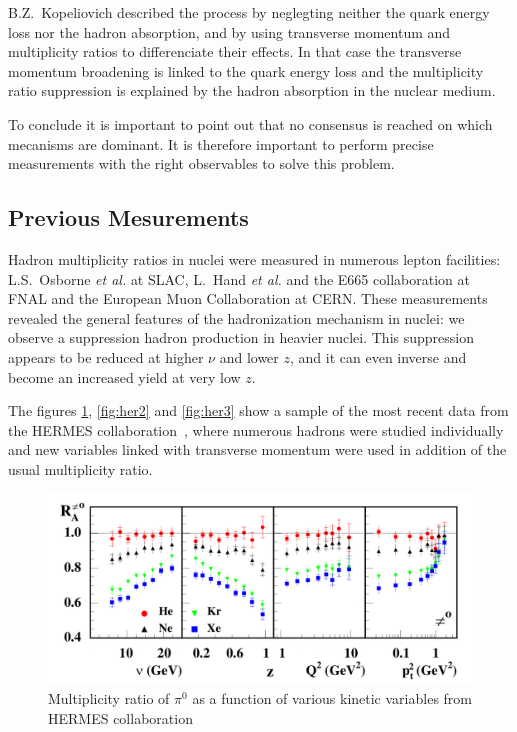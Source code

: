 B.Z.~Kopeliovich \cite{Kopeliovich:2008uy} described the process by neglegting 
neither the quark 
energy loss nor the hadron absorption, and by using transverse momentum and
multiplicity ratios to differenciate their effects. In that case the transverse 
momentum broadening is linked to the quark energy loss and the multiplicity ratio
suppression is explained by the hadron absorption in the nuclear medium.

To conclude it is important to point out that no consensus is reached on which 
mecanisms are dominant. It is therefore important to perform precise measurements with
the right observables to solve this problem.


\subsection{Previous Mesurements}
\label{sec:exp}

Hadron multiplicity ratios in nuclei were measured in numerous lepton 
facilities: L.S.~Osborne {\it et al.} \cite{Osborne:1978ai} at SLAC,
L.~Hand {\it et al.} \cite{Hand:1978tx} and the E665 collaboration \cite{Adams:1994ri} at FNAL
and the European Muon Collaboration \cite{Arvidson:1984fz,Ashman:1991cx} at CERN. These 
measurements revealed the general features of the hadronization mechanism
in nuclei: we observe a suppression hadron production in heavier nuclei.
This suppression appears to be reduced at higher $\nu$ and lower $z$, and it 
can even inverse and become an increased yield at very low $z$. 

The figures \ref{fig:her1}, \ref{fig:her2} and \ref{fig:her3} show a sample of 
the most recent data from the HERMES collaboration~\cite{Airapetian:2007vu}, 
where numerous 
hadrons were studied individually and new variables linked with transverse 
momentum were used in addition of the usual multiplicity ratio.

\begin{figure}[htbp]
\centering
\includegraphics[width=14cm] {fig/Hermes/pi0hermes.png} 
\caption {Multiplicity ratio of $\pi^0$ as a function of various kinetic 
variables from HERMES collaboration \cite{Airapetian:2003mi}}
\label{fig:her1}
\end{figure}

